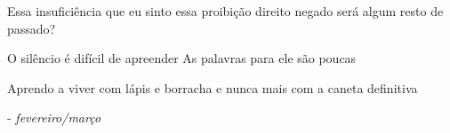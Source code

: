 \begin{poem}
\begin{stanza}
Essa insuficiência que eu sinto\verseline
essa proibição\verseline
direito negado\verseline
será algum\verseline
resto de passado?
\end{stanza}
\begin{stanza}
O silêncio é difícil\verseline
de apreender\verseline
As palavras para ele\verseline
são poucas
\end{stanza}
\begin{stanza}
Aprendo a viver\verseline
com lápis e borracha\verseline
e nunca mais\verseline
com a caneta definitiva
\end{stanza}
\end{poem}

\par\null
\qquad - \textit{fevereiro/março}
